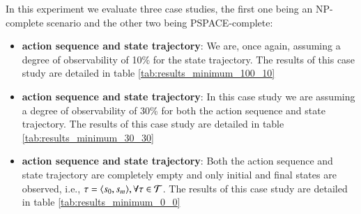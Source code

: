 In this experiment we evaluate three case studies, the first one being an NP-complete scenario and the other two being PSPACE-complete:
\begin{itemize}
	\item \textbf{\FO action sequence and \PO state trajectory}: We are, once again, assuming a degree of observability of 10\% for the state trajectory. The results of this case study are detailed in table \ref{tab:results_minimum_100_10}
	\item  \textbf{\PO action sequence and \PO state trajectory}: In this case study we are assuming a degree of observability of 30\% for both the action sequence and state trajectory. The results of this case study are detailed in table \ref{tab:results_minimum_30_30}
	\item  \textbf{\NO action sequence and \NO state trajectory}: Both the action sequence and state trajectory are completely empty and only initial and final states are observed, i.e., $\tau = {\langle s_0, s_m \rangle}, \forall \tau \in \mathcal{T}$. The results of this case study are detailed in table \ref{tab:results_minimum_0_0}
\end{itemize}

